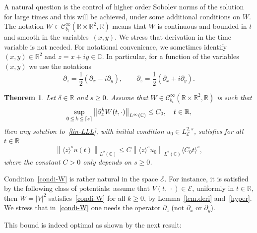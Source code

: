 \documentclass[10pt]{amsart}
\newtheorem{theo}{Theorem}[section]
\theoremstyle{definition}\newtheorem{defi}[theo]{Definition}\newtheorem{rema}[theo]{Remark}\newtheorem{exam}[theo]{Example}\newtheorem{exem}[theo]{Example}\newtheorem{nota}[theo]{Notation}
\DeclarePairedDelimiter\ceil{\lceil}{\rceil}
\newcommand{\C}{\mathbb{C}}
\newcommand{\R}{\mathbb{R}}
\newcommand{\E}{\mathcal{E}}
\newcommand{\clC}{\mathcal{C}}
\newcommand{\ov}{\overline}
\newcommand{\<}{\langle}
\renewcommand{\>}{\rangle}
\begin{document}
A natural question is the control of higher order Sobolev norms of the solution for large times and this will be achieved, under some additional conditions on $W$. The notation $W \in \clC^{\infty}_{b_t}(\R\times \R^2, \R)$ means that $W$ is continuous and bounded in $t$ and smooth in the variables~$(x,y)$. We stress that derivation in the time variable is not needed. For notational convenience, we sometimes identify $(x,y) \in \R^2$ and $z=x+iy \in \C$. In particular, for a function of the variables $(x,y)$ we use the notations
\begin{equation}\label{not-der}
\partial_z=\frac12\left(\partial_x-i\partial_y\right), \qquad \partial_{\ov{z}}=\frac12\left(\partial_x+i\partial_y\right).
\end{equation}



\begin{theo}\label{thm2.2}
Let $\delta \in \R$ and $s\geq 0$. Assume that $W \in \clC^{\infty}_{b_t}(\R\times \R^2, \R)$ is such that
\begin{equation}\label{condi-W}
\sup_{0\,\leq\,k\,\leq\,\ceil[]s} \left\|\partial^k_z W(t,\cdot)\right\|_{L^{\infty}(\C)}\leq C_0, \quad t\in \R,
\end{equation}
then any solution to~\eqref{lin-LLL}, with initial condition $u_0 \in L^{2,s}_\E$, satisfies for all $t\in \R$
\begin{equation}\label{condi-major}
\left\|\<z\>^s u(t)\right\|_{L^{2}(\C)} \leq C\left\|\<z\>^s u_0\right\|_{L^{2}(\C)} \<C_0 t\>^{s},
\end{equation}
where the constant $C>0$ only depends on $s\ge 0$.
\end{theo}



Condition~\eqref{condi-W} is rather natural in the space $\E$. For instance, it is satisfied by the following class of potentials: assume that $V(t,\,\cdot) \in \E$, uniformly in $t\in \R$, then $W=|V|^2$ satisfies~\eqref{condi-W} for all $k \geq 0$, by Lemma~\ref{lem.deri} and~\eqref{hyper}. We stress that in~\eqref{condi-W} one needs the operator $\partial_z$ (not $\partial_x$ or $\partial_y$).



This bound is indeed optimal as shown by the next result:
\end{document}
